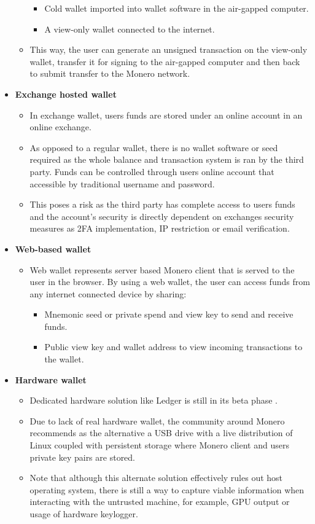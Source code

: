 \documentclass[
  printed, %
  table,   %
  nolof,     %
  nolot,     %
           oneside, color
]{fithesis3}
\begin{document}
\begin{itemize}
\begin{itemize}
\begin{itemize}
\item Cold wallet imported into wallet software in the air-gapped computer.
\item A view-only wallet connected to the internet. 
\end{itemize}
\item This way, the user can generate an unsigned transaction on the view-only wallet, transfer it for signing to the air-gapped computer and then back to submit transfer to the Monero network.
\end{itemize}
\item \textbf{Exchange hosted wallet}
\begin{itemize}\itemsep0em
\item In exchange wallet, users funds are stored under an online account in an online exchange. 
\item As opposed to a regular wallet, there is no wallet software or seed required as the whole balance and transaction system is ran by the third party.
Funds can be controlled through users online account that accessible by traditional username and password. 
\item This poses a risk as the third party has complete access to users funds and the account's security is directly dependent on exchanges security measures as 2FA implementation, IP restriction or email verification.
\end{itemize}
\item \textbf{Web-based wallet}
\begin{itemize}\itemsep0em
\item Web wallet represents server based Monero client that is served to the user in the browser. By using a web wallet, the user can access funds from any internet connected device by sharing:
\begin{itemize}\itemsep0em
\item Mnemonic seed or private spend and view key to send and receive funds.
\item Public view key and wallet address to view incoming transactions to the wallet.
\end{itemize}
\end{itemize}
\item \textbf{Hardware wallet}
\begin{itemize}\itemsep0em
\item Dedicated hardware solution like Ledger is still in its beta phase \cite{ledgermonero}.
\item Due to lack of real hardware wallet, the community around Monero recommends as the alternative a USB drive with a live distribution of Linux coupled with persistent storage where Monero client and users private key pairs are stored. 
\item Note that although this alternate solution effectively rules out host operating system, there is still a way to capture viable information when interacting with the untrusted machine, for example, GPU output or usage of hardware keylogger.

\end{itemize}
\end{itemize} 
\end{document}
